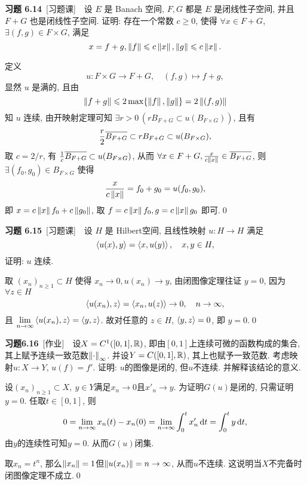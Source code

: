 	\textbf{习题 6.14}\ [习题课]\ \ 设 $ E $ 是 Banach 空间, $ F, G $ 都是 $ E $ 是闭线性子空间, 并且 $ F+G $ 也是闭线性子空间. 证明: 存在一个常数 $ c\geqslant0 $, 使得 $ \forall x\in F+G $, $ \exists(f, g)\in F\times G $, 满足
	\[
		x=f+g, \norm{f}\leqslant c\norm{x}, \norm{g}\leqslant c\norm{x}.
	\]
	\begin{Proof}
		定义
		\[
			u:F\times G\to F+G,\quad (f, g)\mapsto f+g,
		\]
		显然 $ u $ 是满的, 且由 
		\[
			\norm{f+g}\leqslant 2\max\{ \norm{f}, \norm{g} \}=2\norm{(f, g)}
		\]
		知 $ u $ 连续, 由开映射定理可知 $ \exists r>0\,(rB_{F+G}\subset u(B_{F\times G})) $, 且有
		\[
			\frac{r}{2}\baro{B_{F+G}}\subset rB_{F+G}\subset u(B_{F\times G}),
		\]
		取 $ c=2/r $, 有 $ \frac{1}{c}\baro{B_{F+G}}\subset u(B_{F\times G}) $, 从而 $ \forall x\in F+G, \frac{x}{c\norm{x}}\in\baro{B_{F+G}} $, 则 $ \exists (f_{0}, g_{0})\in B_{F\times G} $ 使得
		\[
			\frac{x}{c\norm{x}}=f_{0}+g_{0}=u(f_{0}, g_{0}),
		\]
		即 $ x = c\norm{x}f_{0}+c\norm{g_{0}} $, 取 $ f=c\norm{x}f_{0} , g = c\norm{x}g_{0} $ 即可.\qed
	\end{Proof}
	
	\textbf{习题 6.15}\ [习题课]\ \ 设 $ H $ 是 Hilbert空间, 且线性映射 $ u:H\to H $ 满足
	\[
		\lrangle{u(x), y}=\lrangle{x, u(y)}, \quad x, y\in H,
	\]
	证明: $ u $ 连续.
	\begin{Proof}
		取 $ (x_{n})_{n\geqslant1}\subset H $ 使得 $ x_{n}\to 0, u(x_{n})\to y $, 由闭图像定理往证 $ y=0 $, 因为 $ \forall z\in H $
		\[
			\lrangle{u(x_{n}), z}=\lrangle{x_{n}, u(z)}\to 0,\quad n\to \infty,
		\]
		且 $ \lim\limits_{n\to\infty}\lrangle{u(x_{n}), z}=\lrangle{y, z} $. 故对任意的 $ z\in H $, $ \lrangle{y, z}=0 $, 即 $ y=0 $.\qed
	\end{Proof}
	
	\textbf{习题6.16}\ [作业]\ \ 设$ X=C^1([0,1],\R) $, 即由$ [0,1] $上连续可微的函数构成的集合, 其上赋予连续一致范数$ \norm\cdot_\infty $. 并设$ Y=C([0,1],\R) $, 其上也赋予一致范数. 考虑映射$ u : X\to Y $, $ u(f)=f' $. 证明: $ u $的图像是闭的, 但$ u $不连续. 并解释该结论的意义.
	\begin{Proof}
	设$ (x_n)_{n\geqslant 1}\subset X,\ y\in Y $满足$ x_n\to 0 $且$ x'_n\to y $. 为证明$ G(u) $是闭的, 只需证明$ y=0 $. 任取$ t\in[0,1] $, 则
	\[
	0=\lim_{n\to\infty}x_n(t)-x_n(0)=\lim_{n\to\infty}\int_0^tx'_n\diff t=\int_0^ty\diff t,
	\]
	由$ y $的连续性可知$ y=0 $. 从而$ G(u) $闭集.
	
	取$ x_n=t^n $, 那么$ \norm{x_n}=1 $但$ \norm{u(x_n)}=n\to\infty $, 从而$ u $不连续. 这说明当$ X $不完备时闭图像定理不成立.\qed
	\end{Proof}

